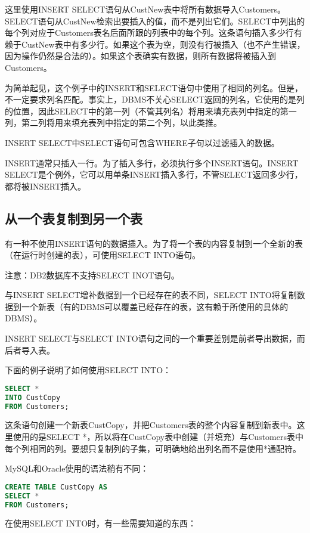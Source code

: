 这里使用INSERT SELECT语句从CustNew表中将所有数据导入Customers。SELECT语句从CustNew检索出要插入的值，而不是列出它们。SELECT中列出的每个列对应于Customers表名后面所跟的列表中的每个列。这条语句插入多少行有赖于CustNew表中有多少行。如果这个表为空，则没有行被插入（也不产生错误，因为操作仍然是合法的）。如果这个表确实有数据，则所有数据将被插入到Customers。

为简单起见，这个例子中的INSERT和SELECT语句中使用了相同的列名。但是，不一定要求列名匹配。事实上，DBMS不关心SELECT返回的列名，它使用的是列的位置，因此SELECT中的第一列（不管其列名）将用来填充表列中指定的第一列，第二列将用来填充表列中指定的第二个列，以此类推。

INSERT SELECT中SELECT语句可包含WHERE子句以过滤插入的数据。

INSERT通常只插入一行。为了插入多行，必须执行多个INSERT语句。INSERT SELECT是个例外，它可以用单条INSERT插入多行，不管SELECT返回多少行，都将被INSERT插入。

\subsection{从一个表复制到另一个表}


有一种不使用INSERT语句的数据插入。为了将一个表的内容复制到一个全新的表（在运行时创建的表），可使用SELECT INTO语句。

注意：DB2数据库不支持SELECT INOT语句。

与INSERT SELECT增补数据到一个已经存在的表不同，SELECT INTO将复制数据到一个新表（有的DBMS可以覆盖已经存在的表，这有赖于所使用的具体的DBMS）。

INSERT SELECT与SELECT INTO语句之间的一个重要差别是前者导出数据，而后者导入表。

下面的例子说明了如何使用SELECT INTO：

\begin{lstlisting}[language=SQL]
SELECT *
INTO CustCopy
FROM Customers;
\end{lstlisting}

这条语句创建一个新表CustCopy，并把Customers表的整个内容复制到新表中。这里使用的是SELECT *，所以将在CustCopy表中创建（并填充）与Customers表中每个列相同的列。要想只复制列的子集，可明确地给出列名而不是使用*通配符。

MySQL和Oracle使用的语法稍有不同：

\begin{lstlisting}[language=SQL]
CREATE TABLE CustCopy AS
SELECT *
FROM Customers;
\end{lstlisting}

在使用SELECT INTO时，有一些需要知道的东西：

